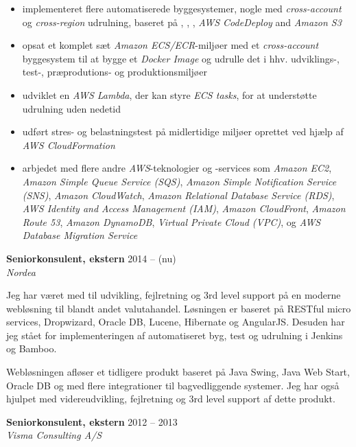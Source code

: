 \documentclass[a4paper,11pt]{article}
\begin{document}
\begin{itemize}
  \item implementeret flere automatiserede byggesystemer, nogle med
    \textit{cross-account} og \textit{cross-region} udrulning, baseret
    på \awscloudformation, \awscodebuild, \awscodepipeline,
    \textit{AWS CodeDeploy} and \textit{Amazon S3}
  \item opsat et komplet sæt \textit{Amazon ECS/ECR}-miljøer med et
    \textit{cross-account} byggesystem til at bygge et \textit{Docker
      Image} og udrulle det i hhv. udviklings-, test-, præprodutions-
    og produktionsmiljøer
  \item udviklet en \textit{AWS Lambda}, der kan styre \textit{ECS
    tasks}, for at understøtte udrulning uden nedetid
  \item udført stres- og belastningstest på midlertidige miljøer
    oprettet ved hjælp af \textit{AWS CloudFormation}
  \item arbjedet med flere andre \textit{AWS}-teknologier og -services
    som \textit{Amazon EC2}, \textit{Amazon Simple Queue Service
      (SQS)}, \textit{Amazon Simple Notification Service (SNS)},
    \textit{Amazon CloudWatch}, \textit{Amazon Relational Database
      Service (RDS)}, \textit{AWS Identity and Access Management
      (IAM)}, \textit{Amazon CloudFront}, \textit{Amazon Route 53},
    \textit{Amazon DynamoDB}, \textit{Virtual Private Cloud (VPC)},
    og \textit{AWS Database Migration Service}
\end{itemize}

\smallskip

\textbf{Seniorkonsulent, ekstern} \hfill 2014 -- (nu) \\
\textsl{Nordea}

Jeg har været med til udvikling, fejlretning og 3rd level support på
en moderne webløsning til blandt andet valutahandel. Løsningen er
baseret på RESTful micro services, Dropwizard, Oracle DB, Lucene,
Hibernate og AngularJS. Desuden har jeg stået for implementeringen af
automatiseret byg, test og udrulning i Jenkins og Bamboo.

Webløsningen afløser et tidligere produkt baseret på Java Swing, Java
Web Start, Oracle DB og med flere integrationer til bagvedliggende
systemer. Jeg har også hjulpet med videreudvikling, fejlretning og 3rd
level support af dette produkt.

\smallskip

\textbf{Seniorkonsulent, ekstern} \hfill 2012 -- 2013 \\
\textsl{Visma Consulting A/S}
\end{document}

